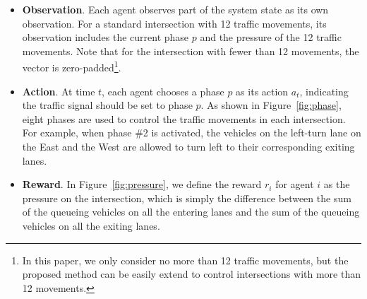 \begin{itemize}
    \item \textbf{Observation}. Each agent observes part of the system state as its own observation. For a standard intersection with 12 traffic movements, its observation includes the current phase $p$ and the pressure of the 12 traffic movements. Note that for the intersection with fewer than 12 movements, the vector is zero-padded\footnote{In this paper, we only consider no more than 12 traffic movements, but the proposed method can be easily extend to control intersections with more than 12 movements.}.
    \item \textbf{Action}. 
         At time $t$, each agent chooses a phase $p$ as its action $a_t$, indicating the traffic signal should be set to phase $p$. 
         As shown in Figure~\ref{fig:phase}, eight phases are used to control the traffic movements in each intersection. For example, when phase \#2 is activated, the vehicles on the left-turn lane on the East and the West are allowed to turn left to their corresponding exiting lanes.
         
         





    \item \textbf{Reward}. In Figure~\ref{fig:pressure}, we define the reward $r_i$ for agent $i$ as the pressure on the intersection, which is simply the difference between the sum of the queueing vehicles on all the entering lanes and the sum of the queueing vehicles on all the exiting lanes.
    

\end{itemize}
